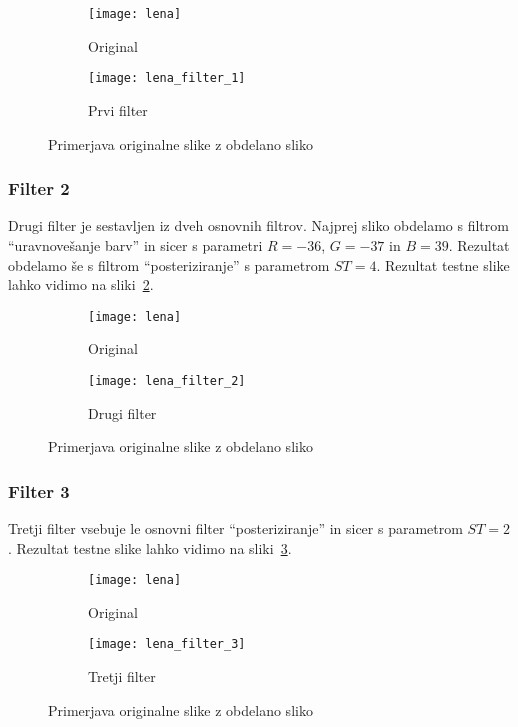 \begin{figure}[h]
    \centering
    \begin{subfigure}[b]{0.4\textwidth}
        \texttt{[image: lena]}
        \caption{Original}
    \end{subfigure}
    \begin{subfigure}[b]{0.4\textwidth}
        \texttt{[image: lena\_filter\_1]}
        \caption{Prvi filter}
    \end{subfigure}
    \caption{Primerjava originalne slike z obdelano sliko}
    \label{fig:lena_filter_1}
\end{figure}


\subsubsection*{Filter 2}
Drugi filter je sestavljen iz dveh osnovnih filtrov. Najprej sliko obdelamo s
filtrom ``uravnovešanje barv'' in sicer s parametri $R = -36$, $G = -37$ in
$B = 39$. Rezultat obdelamo še s filtrom ``posteriziranje'' s parametrom
$ST = 4$. Rezultat testne slike lahko vidimo na sliki~\ref{fig:lena_filter_2}.

\begin{figure}[h]
    \centering
    \begin{subfigure}[b]{0.4\textwidth}
        \texttt{[image: lena]}
        \caption{Original}
    \end{subfigure}
    \begin{subfigure}[b]{0.4\textwidth}
        \texttt{[image: lena\_filter\_2]}
        \caption{Drugi filter}
    \end{subfigure}
    \caption{Primerjava originalne slike z obdelano sliko}
    \label{fig:lena_filter_2}
\end{figure}


\subsubsection*{Filter 3}
Tretji filter vsebuje le osnovni filter ``posteriziranje'' in sicer s parametrom
$ST = 2$. Rezultat testne slike lahko vidimo na sliki~\ref{fig:lena_filter_3}.

\begin{figure}[h]
    \centering
    \begin{subfigure}[b]{0.4\textwidth}
        \texttt{[image: lena]}
        \caption{Original}
    \end{subfigure}
    \begin{subfigure}[b]{0.4\textwidth}
        \texttt{[image: lena\_filter\_3]}
        \caption{Tretji filter}
    \end{subfigure}
    \caption{Primerjava originalne slike z obdelano sliko}
    \label{fig:lena_filter_3}
\end{figure}


